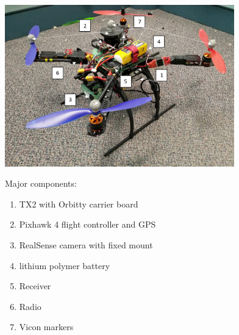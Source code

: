\documentclass[12pt,a4paper]{article}
\begin{document}
  \hspace*{-1.5cm}\begin{minipage}[c]{0.6\textwidth}
    \includegraphics[height=70mm]{quad2/labelled.PNG}
    \label{f: quad}
  \end{minipage}
  \;\;
  \begin{minipage}{0.5\textwidth}
  Major components:
  \begin{enumerate}
  \item TX2 with Orbitty carrier board
  \item Pixhawk 4 flight controller and GPS
  \item RealSense camera with fixed mount
  \item lithium polymer battery
  \item Receiver
  \item Radio
  \item Vicon markers
  \end{enumerate}
  \end{minipage}\hspace*{-1.5cm}

  \newpage
\end{document}
